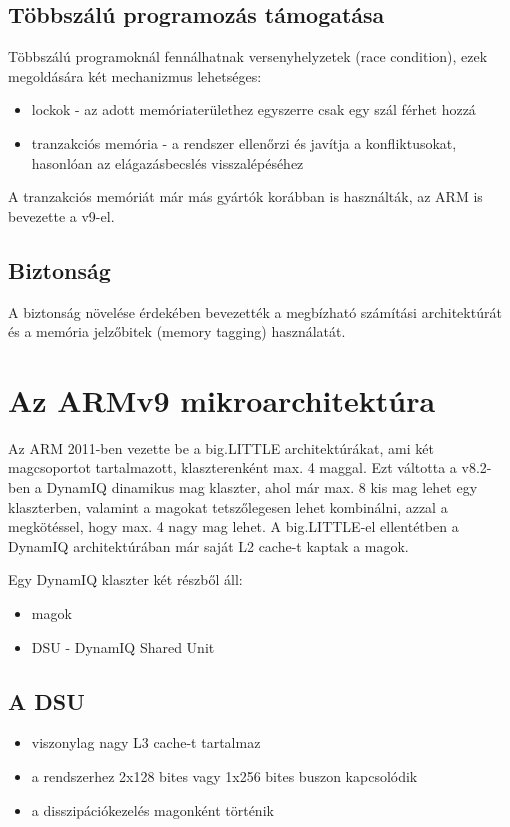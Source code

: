 \subsection{Többszálú programozás támogatása}
Többszálú programoknál fennálhatnak versenyhelyzetek (race condition), ezek megoldására két mechanizmus lehetséges:
\begin{itemize}
    \item lockok - az adott memóriaterülethez egyszerre csak egy szál férhet hozzá
    \item tranzakciós memória - a rendszer ellenőrzi és javítja a konfliktusokat, hasonlóan az elágazásbecslés visszalépéséhez
\end{itemize}
A tranzakciós memóriát már más gyártók korábban is használták, az ARM is bevezette a v9-el.

\subsection{Biztonság}
A biztonság növelése érdekében bevezették a megbízható számítási architektúrát és a memória jelzőbitek (memory tagging) használatát.

\section{Az ARMv9 mikroarchitektúra}
Az ARM 2011-ben vezette be a big.LITTLE architektúrákat, ami két magcsoportot tartalmazott, klaszterenként max. 4 maggal.
Ezt váltotta a v8.2-ben a DynamIQ dinamikus mag klaszter, ahol már max. 8 kis mag lehet egy klaszterben, valamint a magokat tetszőlegesen lehet kombinálni, azzal a megkötéssel, hogy max. 4 nagy mag lehet.
A big.LITTLE-el ellentétben a DynamIQ architektúrában már saját L2 cache-t kaptak a magok.

Egy DynamIQ klaszter két részből áll:
\begin{itemize}
    \item magok
    \item DSU - DynamIQ Shared Unit
\end{itemize}

\subsection{A DSU}
\begin{itemize}
    \item viszonylag nagy L3 cache-t tartalmaz
    \item a rendszerhez 2x128 bites vagy 1x256 bites buszon kapcsolódik
    \item a disszipációkezelés magonként történik
\end{itemize}

